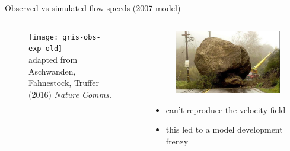 \documentclass[hide notes,intlimits]{beamer}
\begin{document}
\begin{frame}{Observed vs simulated flow speeds (2007 model)}
  \begin{columns}[c]
    \begin{column}{.6\linewidth}
    \begin{figure}
      \texttt{[image: gris-obs-exp-old]}
      \\ \tiny{adapted from Aschwanden, Fahnestock, Truffer (2016) \textit{Nature Comms.}}
    \end{figure}
    \end{column}
    \begin{column}{.4\linewidth}
      \begin{figure}
        \includegraphics[width=.75\textwidth]{roadblocks}
      \end{figure}
      \begin{itemize}
      \item can't reproduce the velocity field
      \item this led to a model development frenzy
      \end{itemize}
    \end{column}
  \end{columns}
  \note[item]{}
\end{frame}
\end{document}
